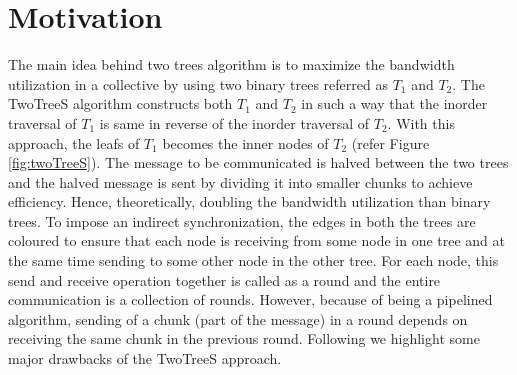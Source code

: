 \documentclass[sigplan,review,anonymous]{acmart}\settopmatter{printfolios=true,printccs=false,printacmref=false}
\begin{document}


\section{Motivation}\label{sec:Motivation}
The main idea behind two trees algorithm is to maximize the bandwidth utilization in a collective by using two binary trees referred as $T_1$ and $T_2$. The TwoTreeS algorithm constructs both $T_1$ and $T_2$ in such a way that the inorder traversal of $T_1$ is same in reverse of the inorder traversal of $T_2$. With this approach, the leafs of $T_1$ becomes the inner nodes of $T_2$ (refer Figure \ref{fig:twoTreeS}). The message to be communicated is halved between the two trees and the halved message is sent by dividing it into smaller chunks to achieve efficiency. Hence, theoretically, doubling the bandwidth utilization than binary trees. To impose an indirect synchronization, the edges in both the trees are coloured to ensure that each node is receiving from some node in one tree and at the same time sending to some other node in the other tree. For each node, this send and receive operation together is called as a round and the entire communication is a collection of rounds. However, because of being a pipelined algorithm, sending of a chunk (part of the message) in a round depends on receiving the same chunk in the previous round. Following we highlight some major drawbacks of the TwoTreeS approach.
\end{document}
